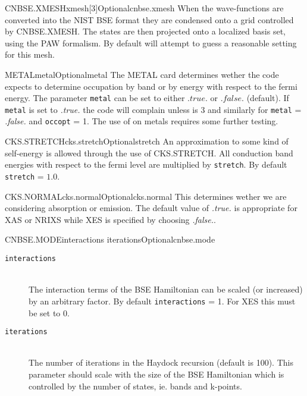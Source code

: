 \documentclass[11pt]{report}
\begin{document}
\begin{Card}{CNBSE.XMESH}{xmesh[3]}{Optional}{cnbse.xmesh}
When the wave-functions are converted into the NIST BSE format they are condensed onto a grid controlled by CNBSE.XMESH. The states are then projected onto a localized basis set, using the PAW formalism. By default  will attempt to guess a reasonable 
setting for this mesh. 
\end{Card}

\begin{Card}{METAL}{metal}{Optional}{metal}
The METAL card determines wether the code expects to determine occupation by band or by energy with respect to the fermi energy. The parameter \texttt{metal} can be set to either $.true.$ or $.false.$ (default). If \texttt{metal} is set to {\it .true.} the code will complain unless  is 3 and similarly for \texttt{metal} = {\it .false.} and \texttt{occopt} = 1. The use of  on metals requires some further testing. 
\end{Card}

\begin{Card}{CKS.STRETCH}{cks.stretch}{Optional}{stretch}
An approximation to some kind of self-energy is allowed through the use of CKS.STRETCH. All conduction band energies with respect to the fermi level are multiplied by \texttt{stretch}. By default \texttt{stretch} = $1.0$. 
\end{Card}

\begin{Card}{CKS.NORMAL}{cks.normal}{Optional}{cks.normal}
This determines wether we are considering absorption or emission. The default value of {\it .true.} is appropriate for XAS or NRIXS
while XES is specified by choosing {\it .false.}.
\end{Card}

\begin{Card}{CNBSE.MODE}{interactions iterations}{Optional}{cnbse.mode}
\begin{description}
\item[\texttt{interactions}]\hfill\\ The interaction terms of the BSE Hamiltonian can be scaled (or increased) by an arbitrary factor. By default \texttt{interactions} = 1. For XES this must be set to 0. 
\item[\texttt{iterations}]\hfill\\ The number of iterations in the Haydock recursion (default is 100). This parameter should scale with the size of the BSE Hamiltonian which is controlled by the number of states, ie. bands and k-points.
\end{description}
\end{Card}
\end{document}
